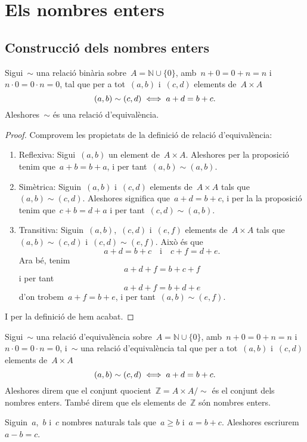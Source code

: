 \documentclass[../../main.tex]{subfiles}
\begin{document}
\section{Els nombres enters}
	\subsection{Construcció dels nombres enters}
	\begin{proposition}
		Sigui~\(\sim\) una relació binària sobre~\(A=\mathbb{N}\cup\{0\}\), amb~\(n+0=0+n=n\) i~\(n\cdot 0=0\cdot n=0\), tal que per a tot~\((a,b)\) i~\((c,d)\) elements de~\(A\times A\)
		\[
		    (a,b)\sim(c,d)\iff a+d=b+c.
		\]
		Aleshores~\(\sim\) és una relació d'equivalència.
		\begin{proof}
			Comprovem les propietats de la definició de relació d'equivalència:
			\begin{enumerate}
				\item Reflexiva: Sigui~\((a,b)\) un element de~\(A\times A\).
				Aleshores per la proposició  tenim que~\(a+b=b+a\), i per tant~\((a,b)\sim(a,b)\).
				\item Simètrica: Siguin~\((a,b)\) i~\((c,d)\) elements de~\(A\times A\) tals que~\((a,b)\sim(c,d)\).
				Aleshores significa que~\(a+d=b+c\), i per la la proposició  tenim que~\(c+b=d+a\) i per tant~\((c,d)\sim(a,b)\).
				\item Transitiva: Siguin~\((a,b)\),~\((c,d)\) i~\((e,f)\) elements de~\(A\times A\) tals que~\((a,b)\sim(c,d)\) i~\((c,d)\sim(e,f)\).
				Això és que
				\[
				    a+d=b+c\quad\text{i}\quad c+f=d+e.
				\]
				Ara bé, tenim
				\[
				    a+d+f=b+c+f
				\]
				i per tant
				\[
				    a+d+f=b+d+e
				\]
				d'on trobem~\(a+f=b+e\), i per tant~\((a,b)\sim(e,f)\).
			\end{enumerate}
			I per la definició de  hem acabat.
		\end{proof}
	\end{proposition}
	\begin{definition}
		\label{def:nombres enters}
		Sigui~\(\sim\) una relació d'equivalència sobre~\(A=\mathbb{N}\cup\{0\}\), amb~\(n+0=0+n=n\) i~\(n\cdot 0=0\cdot n=0\), i~\(\sim\) una relació d'equivalència tal que per a tot~\((a,b)\) i~\((c,d)\) elements de~\(A\times A\)
		\[
		    (a,b)\sim(c,d)\iff a+d=b+c.
		\]
		Aleshores direm que el conjunt quocient~\(\mathbb{Z}=A\times A/\sim\) és el conjunt dels nombres enters.
		També direm que els elements de~\(\mathbb{Z}\) són nombres enters.
	\end{definition}
	\begin{definition}
		\label{def:resta de nombres naturals}
		Siguin~\(a\),~\(b\) i~\(c\) nombres naturals tals que~\(a\geq b\) i~\(a=b+c\).
		Aleshores escriurem~\(a-b=c\).
	\end{definition}
\end{document}

